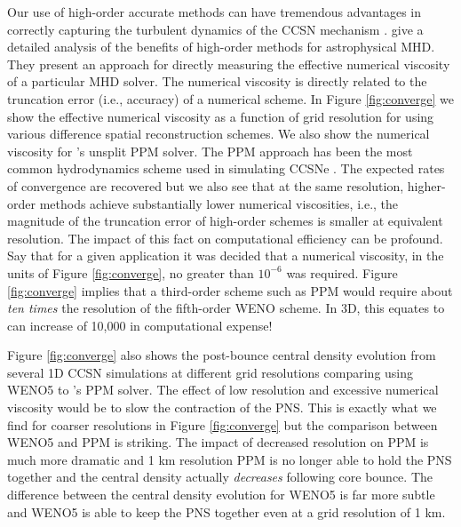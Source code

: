 Our use of high-order accurate methods can have tremendous advantages in correctly capturing the turbulent dynamics of the CCSN mechanism \citep{Radice:2015}.
\citet{Rembiasz:2016} give a detailed analysis of the benefits of high-order methods for astrophysical MHD.
They present an approach for directly measuring the effective numerical viscosity of a particular MHD solver.
The numerical viscosity is directly related to the truncation error (i.e., accuracy) of a numerical scheme.
In Figure \ref{fig:converge} we show the effective numerical viscosity as a function of grid resolution for \spark using various difference spatial reconstruction schemes.
We also show the numerical viscosity for \flash's unsplit PPM solver.
The PPM approach \citep{Colella:1984} has been the most common hydrodynamics scheme used in simulating CCSNe  \citep[e.g.,][]{Fryxell:1991, Janka:1995, Rampp:2000, Blondin:2003, Nordhaus:2010, Couch:2013a, Dolence:2015, Lentz:2015, Muller:2012a}.
The expected rates of convergence are recovered but we also see that at the same resolution, higher-order methods achieve substantially lower numerical viscosities, i.e., the magnitude of the truncation error of high-order schemes is smaller at equivalent resolution.
The impact of this fact on computational efficiency can be profound.
Say that for a given application it was decided that a numerical viscosity, in the units of Figure \ref{fig:converge}, no greater than $10^{-6}$ was required.
Figure \ref{fig:converge} implies that a third-order scheme such as PPM would require about {\it ten times} the resolution of the fifth-order WENO scheme.
In 3D, this equates to can increase of 10,000 in computational expense!

Figure \ref{fig:converge} also shows the post-bounce central density evolution from several 1D CCSN simulations at different grid resolutions comparing \sparkmone using WENO5 to \flash's PPM solver.
The effect of low resolution and excessive numerical viscosity would be to slow the contraction of the PNS.
This is exactly what we find for coarser resolutions in Figure \ref{fig:converge} but the comparison between WENO5 and PPM is striking.
The impact of decreased resolution on PPM is much more dramatic and 1 km resolution PPM is no longer able to hold the PNS together and the central density actually {\it decreases} following core bounce.
The difference between the central density evolution for WENO5 is far more subtle and WENO5 is able to keep the PNS together even at a grid resolution of 1 km.


